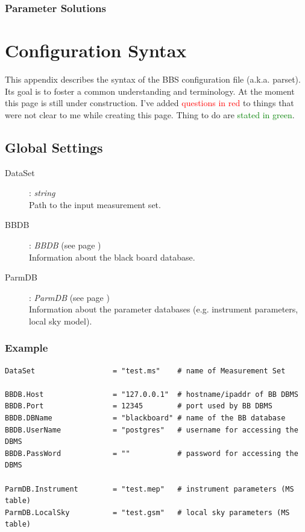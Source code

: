 \documentclass[10pt]{lofar}
\begin{document}
\subsubsection{Parameter Solutions}
\label{subsubsec:design-parmsolutions}

\pagebreak



\pagebreak

\appendix
\section{Configuration Syntax}

This appendix describes the syntax of the BBS configuration file (a.k.a.
parset). Its goal is to foster a common understanding and terminology. At the
moment this page is still under construction. I've added
\textcolor{red}{questions in red} to things that were not clear to me while
creating this page. Thing to do are \textcolor{green}{stated in green}.

\subsection*{Global Settings}
\begin{description}
\item [DataSet] : \emph{string} \\
    Path to the input measurement set.
\item [BBDB] : \emph{BBDB} (see page \pageref{app-bbdb}) \\
    Information about the black board database.
\item [ParmDB] : \emph{ParmDB} (see page \pageref{app-parmdb}) \\
    Information about the parameter databases (e.g. instrument parameters, local
sky model).
\end{description}

\subsubsection*{Example}
{\footnotesize
\begin{verbatim}
DataSet                  = "test.ms"    # name of Measurement Set

BBDB.Host                = "127.0.0.1"  # hostname/ipaddr of BB DBMS
BBDB.Port                = 12345        # port used by BB DBMS
BBDB.DBName              = "blackboard" # name of the BB database
BBDB.UserName            = "postgres"   # username for accessing the DBMS
BBDB.PassWord            = ""           # password for accessing the DBMS

ParmDB.Instrument        = "test.mep"   # instrument parameters (MS table)
ParmDB.LocalSky          = "test.gsm"   # local sky parameters (MS table)
\end{verbatim}
}
\end{document}
